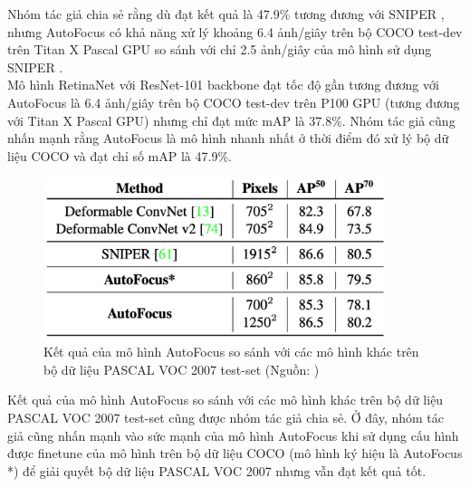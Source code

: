 {    \noindent
    Nhóm tác giả chia sẻ rằng dù đạt kết quả là 47.9\% tương đương với SNIPER , nhưng AutoFocus  có khả năng xử lý khoảng 6.4 ảnh/giây trên bộ COCO test-dev trên Titan X Pascal GPU so sánh với chỉ 2.5 ảnh/giây của mô hình sử dụng SNIPER . \\
    Mô hình RetinaNet với ResNet-101 backbone đạt tốc độ gần tương đương với AutoFocus  là 6.4 ảnh/giây trên bộ COCO test-dev trên P100 GPU (tương đương với Titan X Pascal GPU) nhưng chỉ đạt mức mAP là 37.8\%.
    Nhóm tác giả cũng nhấn mạnh rằng AutoFocus  là mô hình nhanh nhất ở thời điểm đó xử lý bộ dữ liệu COCO và đạt chỉ số mAP là 47.9\%.

    \begin{figure}[H]
        \centering
        \includegraphics[width=10cm] {images/autofocus_results_2}
        \caption{Kết quả của mô hình AutoFocus  so sánh với các mô hình khác trên bộ dữ liệu PASCAL VOC 2007 test-set (Nguồn: \cite{najibi2019autofocus})}
        \label{fig:autofocus_results_2}
    \end{figure}

    \noindent
    Kết quả của mô hình AutoFocus  so sánh với các mô hình khác trên bộ dữ liệu PASCAL VOC 2007 test-set cũng được nhóm tác giả chia sẻ.
    Ở đây, nhóm tác giả cũng nhấn mạnh vào sức mạnh của mô hình AutoFocus  khi sử dụng cấu hình được finetune của mô hình trên bộ dữ liệu COCO (mô hình ký hiệu là AutoFocus *) để giải quyết bộ dữ liệu PASCAL VOC 2007 nhưng vẫn đạt kết quả tốt.

}
